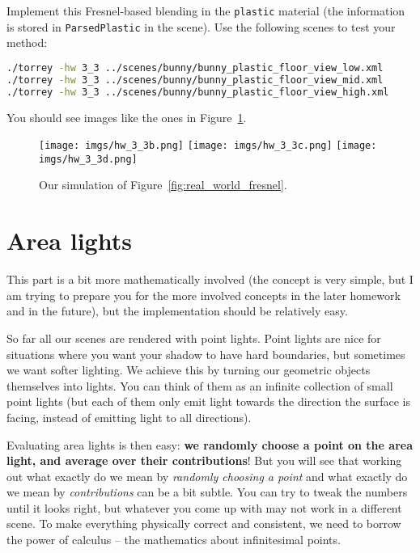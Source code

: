 Implement this Fresnel-based blending in the \lstinline{plastic} material (the information is stored in \lstinline{ParsedPlastic} in the scene). Use the following scenes to test your method:
\begin{lstlisting}[language=bash]
./torrey -hw 3_3 ../scenes/bunny/bunny_plastic_floor_view_low.xml
./torrey -hw 3_3 ../scenes/bunny/bunny_plastic_floor_view_mid.xml
./torrey -hw 3_3 ../scenes/bunny/bunny_plastic_floor_view_high.xml
\end{lstlisting}
You should see images like the ones in Figure~\ref{fig:bunny_fresnel}.
\begin{figure}[ht]
    \centering
    \texttt{[image: imgs/hw\_3\_3b.png]}
    \texttt{[image: imgs/hw\_3\_3c.png]}
    \texttt{[image: imgs/hw\_3\_3d.png]}
    \caption{Our simulation of Figure~\ref{fig:real_world_fresnel}.}
    \label{fig:bunny_fresnel}
\end{figure}

\section{Area lights}
This part is a bit more mathematically involved (the concept is very simple, but I am trying to prepare you for the more involved concepts in the later homework and in the future), but the implementation should be relatively easy.

So far all our scenes are rendered with point lights. Point lights are nice for situations where you want your shadow to have hard boundaries, but sometimes we want softer lighting. We achieve this by turning our geometric objects themselves into lights. You can think of them as an infinite collection of small point lights (but each of them only emit light towards the direction the surface is facing, instead of emitting light to all directions).

Evaluating area lights is then easy: \textbf{we randomly choose a point on the area light, and average over their contributions}! But you will see that working out what exactly do we mean by \emph{randomly choosing a point} and what exactly do we mean by \emph{contributions} can be a bit subtle. You can try to tweak the numbers until it looks right, but whatever you come up with may not work in a different scene. To make everything physically correct and consistent, we need to borrow the power of calculus -- the mathematics about infinitesimal points.

